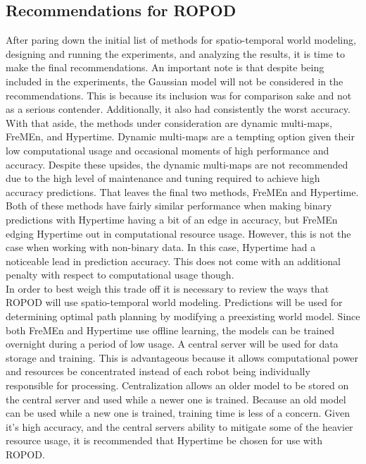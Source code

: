     \subsection{ Recommendations for ROPOD }

    After paring down the initial list of methods for spatio-temporal
    world modeling, designing and running the experiments, and analyzing the
    results, it is time to make the final recommendations. An important note
    is that despite being included in the experiments, the Gaussian model will
    not be considered in the recommendations. This is because its inclusion was
    for comparison sake and not as a serious contender. Additionally, it
    also had consistently the worst accuracy. With that aside, the methods
    under consideration are dynamic multi-maps, FreMEn, and Hypertime.
    Dynamic multi-maps are a tempting option given their low computational
    usage and occasional moments of high performance and accuracy. Despite these upsides,
    the dynamic multi-maps are not recommended due to the high level of maintenance
    and tuning required to achieve high accuracy predictions. That leaves the
    final two methods, FreMEn and Hypertime. Both of these methods have fairly
    similar performance when making binary predictions with Hypertime having a
    bit of an edge in accuracy, but FreMEn edging Hypertime out in computational
    resource usage. However, this is not the case when working with non-binary
    data. In this case, Hypertime had a noticeable lead in prediction accuracy.
    This does not come with an additional penalty with respect to computational
    usage though. \\

    In order to best weigh this trade off it is necessary to review the ways
    that ROPOD will use spatio-temporal world modeling. Predictions will
    be used for determining optimal path planning by modifying a preexisting
    world model. Since both FreMEn and Hypertime use offline learning, the models
    can be trained overnight during a period of low usage. A central server
    will be used for data storage and training. This is advantageous because
    it allows computational power and resources be concentrated instead of each
    robot being individually responsible for processing. Centralization
    allows an older model to be stored on the central server and used
    while a newer one is trained. Because an old model can be used while a new
    one is trained, training time is less of a concern.
    Given it's high accuracy, and the central servers ability to mitigate some
    of the heavier resource usage, it is recommended that Hypertime be chosen
    for use with ROPOD. \\

